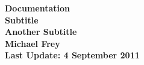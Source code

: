 \documentclass[paper=a4,nenglish]{scrartcl}
\begin{document}
\begin{titlepage}   


\setlength{\parindent}{0em}   

\begin{minipage}{170mm} 
  \begin{minipage}{5cm}
    \par\vspace*{4mm}
  \end{minipage}
  \begin{minipage}{6cm}
    \hfill
  \end{minipage}
  \begin{minipage}{5cm} 
    \centering
  \end{minipage}   
\end{minipage}  
\smallskip  \centering
  \begin{minipage}{\textwidth}     \centering     \vspace{5cm}
    \renewcommand{\baselinestretch}{1.8}    \small\normalsize     {\Huge \bf
    Documentation \\ \normalsize Subtitle \\ Another Subtitle}\\ \vspace{2cm} {\normalsize \bf Michael Frey}\\  \vspace{6cm} {\small \bf
    Last Update: 4 September 2011 }\\    \renewcommand{\baselinestretch}{1}
    \small\normalsize   \end{minipage}   
\clearpage 
\end{titlepage} 

\newpage
\tableofcontents
\newpage
\lstlistoflistings








\end{document}
